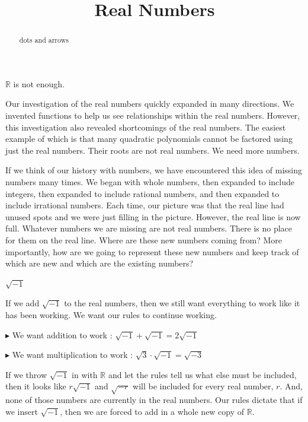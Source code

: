 \documentclass{ximera}
\title{Real Numbers}
\begin{document}
\begin{abstract}
dots and arrows
\end{abstract}
\maketitle



\textbf{$\mathbb{R}$} is not enough.  



Our investigation of the real numbers quickly expanded in many directions. We invented functions to help us see relationships within the real numbers.  However, this investigation also revealed shortcomings of the real numbers. The easiest example of which is that many quadratic polynomials cannot be factored using just the real numbers. Their roots are not real numbers. We need more numbers.


If we think of our history with numbers, we have encountered this idea of missing numbers many times.  We began with whole numbers, then expanded to include integers, then expanded to include rational numbers, and then expanded to include irrational numbers.  Each time, our picture was that the real line had unused spots and we were just filling in the picture.  However, the real line is now full. Whatever numbers we are missing are not real numbers.  There is no place for them on the real line.  Where are these new numbers coming from? More importantly, how are we going to represent these new numbers and keep track of which are new and which are the existing numbers?


\begin{idea} \textbf{\textcolor{blue!55!black}{$\sqrt{-1}$}} 


If we add $\sqrt{-1}$ to the real numbers, then we still want everything to work like it has been working.  We want our rules to continue working.


$\blacktriangleright$ We want addition to work : $\sqrt{-1} + \sqrt{-1} = 2\sqrt{-1}$ 

$\blacktriangleright$ We want multiplication to work : $\sqrt{3} \cdot \sqrt{-1} = \sqrt{-3}$ 


\end{idea}


If we throw $\sqrt{-1}$ in with $\mathbb{R}$ and let the rules tell us what else must be included, then it looks like $r\sqrt{-1}$ and $\sqrt{-r}$ will be included for every real number, $r$.  And, none of those numbers are currently in the real numbers. Our rules dictate that if we insert $\sqrt{-1}$, then we are forced to add in a whole new copy of $\mathbb{R}$.
\end{document}
